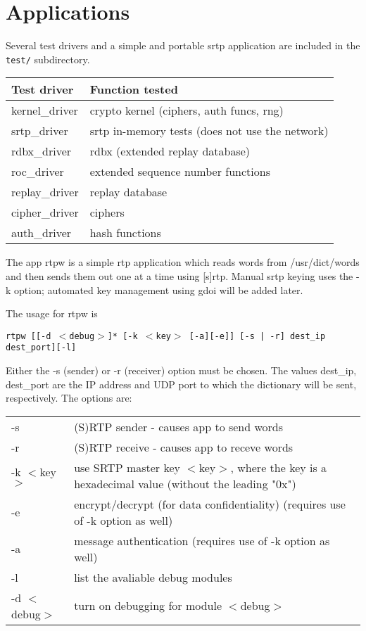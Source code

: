 \hypertarget{main_Applications}{}\section{Applications}\label{main_Applications}
 

Several test drivers and a simple and portable srtp application are
included in the \texttt{test/} subdirectory.

\begin{center}
\begin{tabular}{ll}
\hline
Test driver    	& Function tested	\\
\hline
kernel\_driver   & crypto kernel (ciphers, auth funcs, rng) \\
srtp\_driver	& srtp in-memory tests (does not use the network) \\
rdbx\_driver	& rdbx (extended replay database) \\
roc\_driver	& extended sequence number functions \\ 
replay\_driver	& replay database  \\
cipher\_driver	& ciphers  \\
auth\_driver	& hash functions \\
\hline
\end{tabular}
\end{center}

The app rtpw is a simple rtp application which reads words from
/usr/dict/words and then sends them out one at a time using [s]rtp.
Manual srtp keying uses the -k option; automated key management
using gdoi will be added later.

The usage for rtpw is

\texttt{rtpw [[-d $<$debug$>$]* [-k $<$key$>$ [-a][-e]] [-s | -r] dest\_ip
dest\_port][-l]}

Either the -s (sender) or -r (receiver) option must be chosen.  The
values dest\_ip, dest\_port are the IP address and UDP port to which
the dictionary will be sent, respectively.  The options are:
\begin{center}
\begin{tabular}{ll}
  -s		& (S)RTP sender - causes app to send words \\
  -r		& (S)RTP receive - causes app to receve words \\
  -k $<$key$>$      & use SRTP master key $<$key$>$, where the 
		key is a hexadecimal value (without the
                leading "0x") \\
  -e            & encrypt/decrypt (for data confidentiality)
                (requires use of -k option as well)\\
  -a            & message authentication 
                (requires use of -k option as well) \\
  -l            & list the avaliable debug modules \\
  -d $<$debug$>$    & turn on debugging for module $<$debug$>$ \\
\end{tabular}
\end{center}

